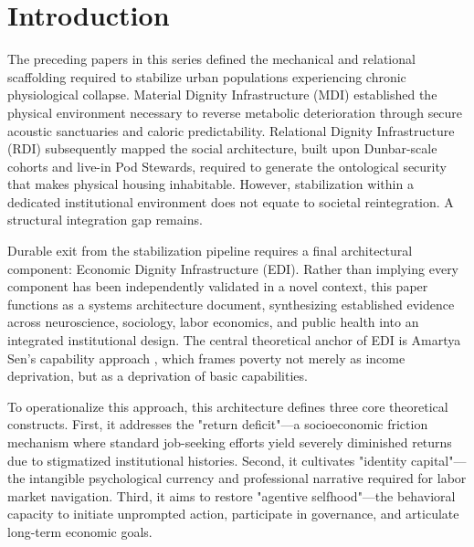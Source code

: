 \documentclass[12pt, letterpaper]{article}
\begin{document}
\newpage
\vspace{12pt}
\begingroup
{}
\setlength{\cftbeforesecskip}{2pt}
\setlength{\cftbeforesubsecskip}{-2pt}
\tableofcontents
\endgroup

\section{Introduction}

The preceding papers in this series defined the mechanical and relational scaffolding required to stabilize urban populations experiencing chronic physiological collapse. Material Dignity Infrastructure (MDI) established the physical environment necessary to reverse metabolic deterioration through secure acoustic sanctuaries and caloric predictability. Relational Dignity Infrastructure (RDI) subsequently mapped the social architecture, built upon Dunbar-scale cohorts and live-in Pod Stewards, required to generate the ontological security that makes physical housing inhabitable. However, stabilization within a dedicated institutional environment does not equate to societal reintegration. A structural integration gap remains.

Durable exit from the stabilization pipeline requires a final architectural component: Economic Dignity Infrastructure (EDI). Rather than implying every component has been independently validated in a novel context, this paper functions as a systems architecture document, synthesizing established evidence across neuroscience, sociology, labor economics, and public health into an integrated institutional design. The central theoretical anchor of EDI is Amartya Sen's capability approach \cite{sen1999development}, which frames poverty not merely as income deprivation, but as a deprivation of basic capabilities. 

To operationalize this approach, this architecture defines three core theoretical constructs. First, it addresses the "return deficit"—a socioeconomic friction mechanism where standard job-seeking efforts yield severely diminished returns due to stigmatized institutional histories. Second, it cultivates "identity capital"—the intangible psychological currency and professional narrative required for labor market navigation. Third, it aims to restore "agentive selfhood"—the behavioral capacity to initiate unprompted action, participate in governance, and articulate long-term economic goals.
\end{document}
